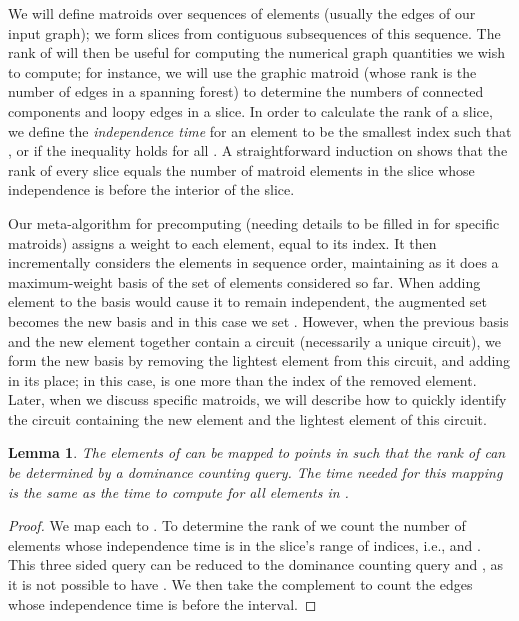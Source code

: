 \documentclass[11pt]{article}
\newtheorem{lemma}{Lemma}
\begin{document}
We will define matroids over sequences  of elements (usually the edges of our input graph); we form slices  from contiguous subsequences of this sequence. The rank of  will then be useful for computing the numerical graph quantities we wish to compute; for instance, we will use the graphic matroid (whose rank is the number of edges in a spanning forest) to determine the numbers of connected components and loopy edges in a slice. In order to calculate the rank of a slice, we define the \emph{independence time}  for an element  to be the smallest index  such that , or  if the inequality holds for all . A straightforward induction on  shows that the rank of every slice  equals the number of matroid elements in the slice whose independence is before the interior of the slice.

Our meta-algorithm for precomputing  (needing details to be filled in for  specific matroids) assigns a weight to each element, equal to its index. It then incrementally considers the elements in sequence order, maintaining as it does a maximum-weight basis of the set of elements considered so far. When adding element  to the basis would cause it to remain independent, the augmented set becomes the new basis and in this case we set . However, when the previous basis and the new element together contain a circuit (necessarily a unique circuit), we form the new basis by removing the lightest element from this circuit, and adding  in its place; in this case,  is one more than the index of the removed element. Later, when we discuss specific matroids, we will describe how to quickly identify the circuit containing the new element and the lightest element of this circuit.

\begin{lemma}\label{lem:general-matroid}
The elements of  can be mapped to points in  such that the rank of  can be determined by a dominance counting query. The time needed for this mapping is the same as the time to compute  for all elements in .
\end{lemma}
\begin{proof}
We map each  to . To determine the rank of  we count the number of elements whose independence time is in the slice's range of indices, i.e.,   and . This three sided query can be reduced to the dominance counting query  and , as it is not possible to have . We then take the complement to count the edges whose independence time is before the interval.
\end{proof}
\end{document}
